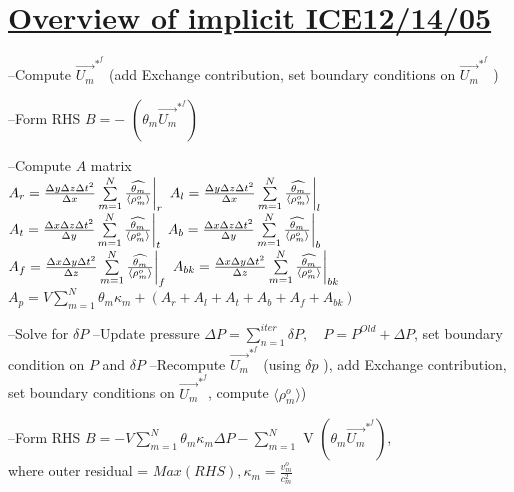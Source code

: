\documentclass[fleqn]{article}
\newcommand{\SUM}[1]    {\ensuremath{\sum \limits_{{#1}=1}^N }}
\newcommand{\B}[1]      {\biggr{#1}}
\newcommand{\rhoM}      {\ensuremath{\rho^{o}_m}}
\newcommand{\rhoMFC}    {\ensuremath{\langle \rhoM \rangle}}
\newcommand{\delt}      {\ensuremath{\Delta{t}} }
\newcommand{\delx}      {\ensuremath{\Delta{x}} }
\newcommand{\dely}      {\ensuremath{\Delta{y}} }
\newcommand{\delz}      {\ensuremath{\Delta{z}} }
\newcommand{\velFC}     {\ensuremath{\vec{U_m}^{*^{f}} } }
\newcommand{\thetaUW}   {\ensuremath{\widehat{\theta_m}} }
\begin{document}
\setlength{\abovedisplayskip}{0.1in}
\setlength{\mathindent}{0.0in}
\section{\underline{Overview of implicit ICE\hspace{ 0.5in}12/14/05}  }

\begin{algorithmic}
\STATE --Compute $ \velFC$ (add Exchange contribution, set boundary
             conditions on $\velFC$ )
             
\STATE --Form RHS $B = -$ $(\theta_m \velFC)$
    

    \STATE --Compute $A$ matrix \\ \quad
      $A_r = \frac{\dely\delz\delt^2}{\delx} \SUM{m} \frac{\thetaUW}{\rhoMFC} \B{|}_{r}$ \quad
      $A_l = \frac{\dely\delz\delt^2}{\delx} \SUM{m} \frac{\thetaUW}{\rhoMFC} \B{|}_{l}$ \\ \quad
      $A_t = \frac{\delx\delz\delt^2}{\dely} \SUM{m} \frac{\thetaUW}{\rhoMFC} \B{|}_{t}$ \quad
      $A_b = \frac{\delx\delz\delt^2}{\dely} \SUM{m} \frac{\thetaUW}{\rhoMFC} \B{|}_{b}$ \\ \quad
      $A_f = \frac{\delx\dely\delt^2}{\delz} \SUM{m} \frac{\thetaUW}{\rhoMFC} \B{|}_{f}$ \quad
      $A_{bk} = \frac{\delx\dely\delt^2}{\delz} \SUM{m} \frac{\thetaUW}{\rhoMFC} \B{|}_{bk}$ \\ \quad
      $A_{p} =V\SUM{m} \theta_m \kappa_m +( A_r + A_l + A_t + A_b + A_f + A_ {bk})$
      
    \STATE --Solve for $\delta{P}$
    \STATE --Update pressure $\Delta{P} = \sum \limits_{n=1}^{iter} \delta{P}, \quad P = P^{Old} + \Delta{P}$, set boundary condition on $P$ and $\delta{P}$
    \STATE --Recompute $ \velFC$ (using $\delta {p}$ ), add Exchange contribution, set boundary
             conditions on $\velFC$, compute $ \rhoMFC $)
             
    \STATE --Form RHS $B = -V\SUM{m} \theta_m \kappa_m \Delta{P} - \SUM{m}$ V $(\theta_m \velFC)$,\\ \quad
             where outer residual = $Max(RHS), \kappa_m = \frac{v^o_m}{c_m^2}$
    
\ENDWHILE

\end{algorithmic}
\newpage
\end{document}
